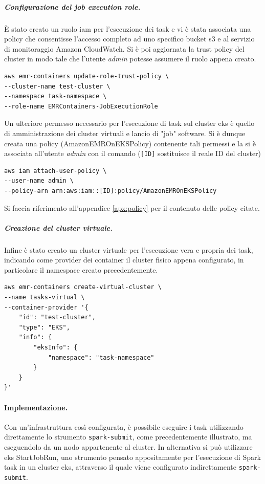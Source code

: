 \documentclass[12pt,a4paper,fleqn,titlepage]{report}
\begin{document}
            \subparagraph{Configurazione del \emph{job execution role}.}
            È stato creato un ruolo \gls{iam} per l'esecuzione dei task e vi è stata associata una policy che consentisse l'accesso completo ad uno specifico bucket \gls{s3} e al servizio di monitoraggio Amazon CloudWatch.
            Si è poi aggiornata la trust policy del \gls{cluster} in modo tale che l'utente \emph{admin} potesse assumere il ruolo appena creato.
            \begin{lstlisting}[numbers=none]
aws emr-containers update-role-trust-policy \
--cluster-name test-cluster \
--namespace task-namespace \
--role-name EMRContainers-JobExecutionRole
            \end{lstlisting}
            Un ulteriore permesso necessario per l'esecuzione di task sul \gls{cluster} \gls{eks} è quello di amministrazione dei \gls{cluster} virtuali e lancio di "job" software. Si è dunque creata una policy (AmazonEMROnEKSPolicy) contenente tali permessi e la si è associata all'utente \emph{admin} con il comando (\lstinline{[ID]} sostituisce il reale ID del \gls{cluster})
            \begin{lstlisting}[numbers=none]
aws iam attach-user-policy \
--user-name admin \
--policy-arn arn:aws:iam::[ID]:policy/AmazonEMROnEKSPolicy
            \end{lstlisting}
            Si faccia riferimento all'appendice \ref{apx:policy} per il contenuto delle policy citate.

            \subparagraph{Creazione del cluster virtuale.}
            Infine è stato creato un \gls{cluster} virtuale per l'esecuzione vera e propria dei task, indicando come provider dei \gls{container} il \gls{cluster} fisico appena configurato, in particolare il namespace creato precedentemente.
            \begin{lstlisting}[numbers=none]
aws emr-containers create-virtual-cluster \
--name tasks-virtual \
--container-provider '{
    "id": "test-cluster",
    "type": "EKS",
    "info": {
        "eksInfo": {
            "namespace": "task-namespace"
        }
    }
}'
            \end{lstlisting}

        \paragraph{Implementazione.}
        Con un'infrastruttura così configurata, è possibile eseguire i task utilizzando direttamente lo strumento \lstinline{spark-submit}, come precedentemente illustrato, ma eseguendolo da un nodo appartenente al cluster. In alternativa si può utilizzare \gls{eks} StartJobRun, uno strumento pensato appositamente per l'esecuzione di Spark task in un cluster \gls{eks}, attraverso il quale viene configurato indirettamente \lstinline{spark-submit}.
\end{document}
